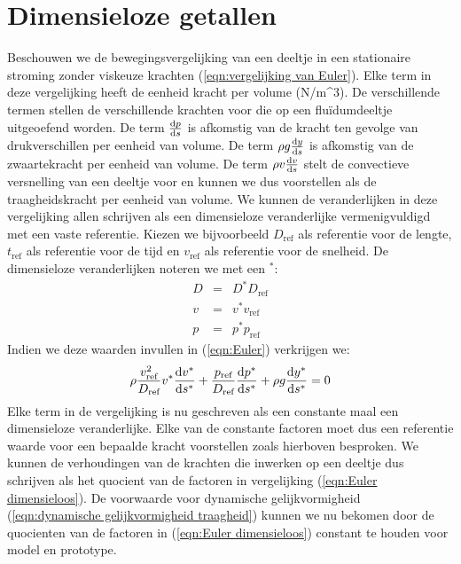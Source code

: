 	\section{Dimensieloze getallen}
Beschouwen we de bewegingsvergelijking van een deeltje in een stationaire stroming zonder viskeuze krachten (\ref{eqn:vergelijking van Euler}). Elke term in deze vergelijking heeft de eenheid kracht per volume (\unit{}{N/m^3}). De verschillende termen stellen de verschillende krachten voor die op een flu\"idumdeeltje uitgeoefend worden. De term $\frac{\mathrm{d} p}{\mathrm{d} s}$ is afkomstig van de kracht ten gevolge van drukverschillen per eenheid van volume. De term $\rho g \frac{\mathrm{d} y}{\mathrm{d} s}$ is afkomstig van de zwaartekracht per eenheid van volume. De term $\rho v \frac{\mathrm{d} v}{\mathrm{d} s}$ stelt de convectieve versnelling van een deeltje voor en kunnen we dus voorstellen als de traagheidskracht per eenheid van volume.
\npar
We kunnen de veranderlijken in deze vergelijking allen schrijven als een dimensieloze veranderlijke vermenigvuldigd met een vaste referentie. Kiezen we bijvoorbeeld $D_{\text{ref}}$ als referentie voor de lengte, $t_{\text{ref}}$ als referentie voor de tijd en $v_{\text{ref}}$ als referentie voor de snelheid. De dimensieloze veranderlijken noteren we met een $^*$: 
\begin{eqnarray}
	D &=& D^* D_{\text{ref}} \nonumber \\
	v &=& v^* v_{\text{ref}}  \\
	p &=& p^* p_{\text{ref}} \nonumber
	\label{eqn:referentie grootheden}
\end{eqnarray}
Indien we deze waarden invullen in (\ref{eqn:Euler}) verkrijgen we:
\begin{equation}
	\rho \frac{v_{\text{ref}}^2}{D_{\text{ref}}} v^* \frac{\mathrm{d} v^*}{\mathrm{d} s^*} + \frac{p_{\text{ref}}}{D_{\text{ref}}} \frac{\mathrm{d} p^*}{\mathrm{d} s^*} + \rho g \frac{\mathrm{d} y^*}{\mathrm{d} s^*} = 0
	\label{eqn:Euler dimensieloos}
\end{equation}
Elke term in de vergelijking is nu geschreven als een constante maal een dimensieloze veranderlijke. Elke van de constante factoren moet dus een referentie waarde voor een bepaalde kracht voorstellen zoals hierboven besproken.
\npar
We kunnen de verhoudingen van de krachten die inwerken op een deeltje dus schrijven als het quocient van de factoren in vergelijking (\ref{eqn:Euler dimensieloos}). De voorwaarde voor dynamische gelijkvormigheid (\ref{eqn:dynamische gelijkvormigheid traagheid}) kunnen we nu bekomen door de quocienten van de factoren in (\ref{eqn:Euler dimensieloos}) constant te houden voor model en prototype.
